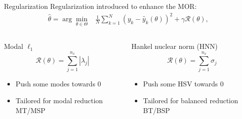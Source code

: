 \documentclass{beamer}
\begin{document}
\begin{frame}{Regularization}
Regularization introduced to enhance the MOR:
\begin{align*}
\hat{\theta} =  \arg\min_{\theta \in \Theta}  & \frac{1}{N}\sum_{k=1}^N \left(y_k - \hat{y}_k(\theta) \right)^2 +  \gamma \mathcal{R}(\theta),  
\end{align*}

\begin{columns}
\begin{block}{Modal $\ell_1$}
\begin{equation*}
    \mathcal{R}(\theta) = \sum_{j=1}^{n_x} |\lambda_j|
\end{equation*}
\begin{itemize}
\item Push some modes towards 0
\item Tailored for modal reduction MT/MSP
\end{itemize}

\end{block}
\begin{block}{Hankel nuclear norm (HNN)} 
\begin{equation*}
	\mathcal{R}(\theta) = \sum_{j=1}^{n_x} \sigma_j
\end{equation*}
\begin{itemize}
\item Push some HSV  towards 0
\item Tailored for balanced reduction BT/BSP
\end{itemize}
\end{block}
\end{columns}
\end{frame}
\end{document}
